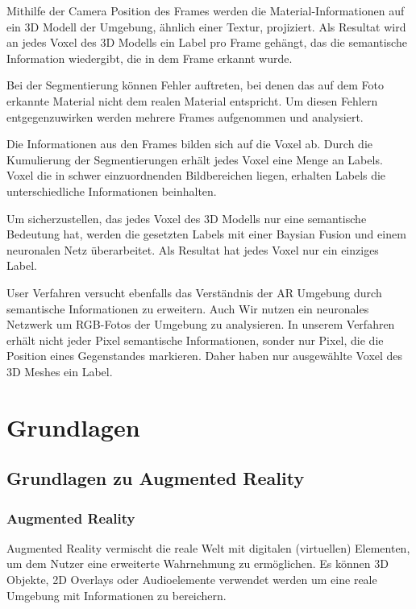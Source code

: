 Mithilfe der Camera Position des Frames werden die Material-Informationen auf ein 3D Modell der Umgebung, ähnlich einer Textur, projiziert. Als Resultat wird an jedes Voxel des 3D Modells ein Label pro Frame gehängt, das die semantische Information wiedergibt, die in dem Frame erkannt wurde.

Bei der Segmentierung können Fehler auftreten, bei denen das auf dem Foto erkannte Material nicht dem realen Material entspricht. Um diesen Fehlern entgegenzuwirken werden mehrere Frames aufgenommen und analysiert. %

Die Informationen aus den Frames bilden sich auf die Voxel ab. Durch die Kumulierung der Segmentierungen erhält jedes Voxel eine Menge an Labels. Voxel die in schwer einzuordnenden Bildbereichen liegen, erhalten Labels die unterschiedliche Informationen beinhalten.

Um sicherzustellen, das jedes Voxel des 3D Modells nur eine semantische Bedeutung hat, werden die gesetzten Labels mit einer Baysian Fusion und einem neuronalen Netz überarbeitet. Als Resultat hat jedes Voxel nur ein einziges Label.

User Verfahren versucht ebenfalls das Verständnis der AR Umgebung durch semantische Informationen zu erweitern. Auch Wir nutzen ein neuronales Netzwerk um RGB-Fotos der Umgebung zu analysieren.
In unserem Verfahren erhält nicht jeder Pixel semantische Informationen, sonder nur Pixel, die die Position eines Gegenstandes markieren. Daher haben nur ausgewählte Voxel des 3D Meshes ein Label.\citep{contextawaremixedreality}

\newpage
\section{Grundlagen}
\subsection{Grundlagen zu Augmented Reality}
\subsubsection{Augmented Reality} %

Augmented Reality vermischt die reale Welt mit digitalen (virtuellen) Elementen, um dem Nutzer eine erweiterte Wahrnehmung zu ermöglichen. Es können 3D Objekte, 2D Overlays oder Audioelemente verwendet werden um eine reale Umgebung mit Informationen zu bereichern. 

